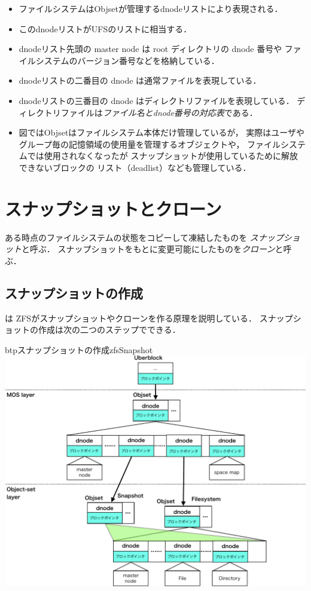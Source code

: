 \begin{itemize}
\item ファイルシステムはObjsetが管理するdnodeリストにより表現される．
\item このdnodeリストがUFSの{\inode}リストに相当する．
\item dnodeリスト先頭の master node は root ディレクトリの dnode 番号や
  ファイルシステムのバージョン番号などを格納している．
\item dnodeリストの二番目の dnode は通常ファイルを表現している．
\item dnodeリストの三番目の dnode はディレクトリファイルを表現している．
  ディレクトリファイルは\emph{ファイル名とdnode番号の対応表}である．
\item 図ではObjsetはファイルシステム本体だけ管理しているが，
  実際はユーザやグループ毎の記憶領域の使用量を管理するオブジェクトや，
  ファイルシステムでは使用されなくなったが
  スナップショットが使用しているために解放できないブロックの
  リスト（deadlist）なども管理している．
\end{itemize}

\section{スナップショットとクローン}
ある時点のファイルシステムの状態をコピーして凍結したものを
\emph{スナップショット}と呼ぶ．
スナップショットをもとに変更可能にしたものを\emph{クローン}と呼ぶ．

\subsection{スナップショットの作成}
は
ZFSがスナップショットやクローンを作る原理を説明している．
スナップショットの作成は次の二つのステップでできる．

\begin{myfig}{btp}{スナップショットの作成}{zfsSnapshot}
  \centering\includegraphics[scale=0.7]{Fig/zfsSnapshot-crop.pdf}
\end{myfig}

